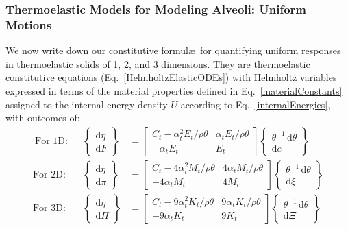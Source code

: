 \subsubsection{Thermoelastic Models for Modeling Alveoli: Uniform Motions}

We now write down our constitutive formul\ae\ for quantifying uniform responses in thermo\-elastic solids of 1, 2, and 3 dimensions.  They are thermo\-elastic constitutive equations (Eq.~\ref{HelmholtzElasticODEs}) with Helmholtz variables expressed in terms of the material properties defined in Eq.~\ref{materialConstants} assigned to the internal energy density $U$ according to Eq.~\ref{internalEnergies}, with outcomes of:
\begin{subequations}
    \label{HelmholtzCEs}
    \begin{align}\
    \text{For 1D:} & &
    \left\{ \begin{matrix}
    \mathrm{d} \eta \\ \mathrm{d} F
    \end{matrix} \right\} & = \begin{bmatrix}
    C_t - \alpha^2_t E_t / \rho \theta & 
    \alpha_t E_t / \rho \theta \\
    -\alpha_t E_t & E_t
    \end{bmatrix} \left\{ \begin{matrix}
    \theta^{-1} \, \mathrm{d} \theta \\ \mathrm{d} e
    \end{matrix} \right\} \label{Helmholtz1D} \\
    \text{For 2D:} & &
    \left\{ \begin{matrix}
    \mathrm{d} \eta \\ \mathrm{d} \pi
    \end{matrix} \right\} & = \begin{bmatrix}
    C_t - 4 \alpha_t^2 M_t / \rho \theta & 
    4 \alpha_t M_t / \rho \theta \\
    -4 \alpha_t M_t & 4 M_t
    \end{bmatrix} \left\{ \begin{matrix}
    \theta^{-1} \, \mathrm{d} \theta \\ \mathrm{d} \xi
    \end{matrix} \right\} \label{Helmholtz2D} \\
    \text{For 3D:} & &
    \left\{ \begin{matrix}
    \mathrm{d} \eta \\ \mathrm{d} \Pi
    \end{matrix} \right\} & = \begin{bmatrix}
    C_t - 9 \alpha^2_t K_t / \rho \theta & 
    9 \alpha_t K_t / \rho \theta \\
    -9 \alpha_t K_t & 9 K_t
    \end{bmatrix} \left\{ \begin{matrix}
    \theta^{-1} \, \mathrm{d} \theta \\ \mathrm{d} \Xi
    \end{matrix} \right\} \label{Helmholtz3D}
    \end{align}
\end{subequations}
